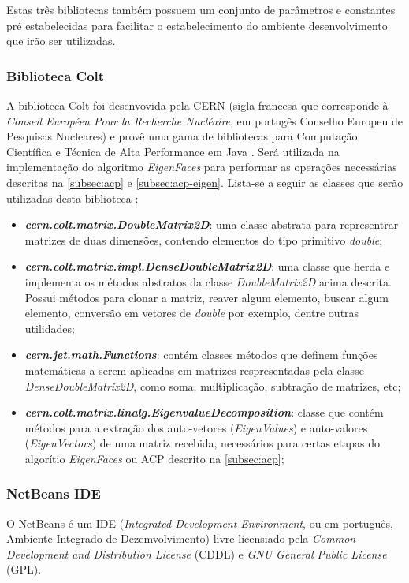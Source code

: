 Estas três bibliotecas também possuem um conjunto de parâmetros e constantes pré estabelecidas para facilitar o estabelecimento do ambiente desenvolvimento que irão ser utilizadas.

\subsubsection{Biblioteca Colt}\label{subsec:bib_colt}
A biblioteca Colt foi desenvovida pela CERN (sigla francesa que corresponde à \textit{Conseil Européen Pour la Recherche Nucléaire}, em portugês Conselho Europeu de Pesquisas Nucleares) e provê uma gama de bibliotecas para Computação Científica e Técnica de Alta Performance em Java \cite{colt}. Será utilizada na implementação do algoritmo \textit{EigenFaces} para performar as operações necessárias descritas na \autoref{subsec:acp} e \autoref{subsec:acp-eigen}. Lista-se a seguir as classes que serão utilizadas desta biblioteca \cite{colt}:


\begin{itemize}
	\item \textbf{\textit{cern.colt.matrix.DoubleMatrix2D}}: uma classe abstrata para representrar matrizes de duas dimensões, contendo elementos do tipo primitivo \textit{double};
	
	\item \textbf{\textit{cern.colt.matrix.impl.DenseDoubleMatrix2D}}: uma classe que herda e implementa os métodos abstratos da classe \textit{DoubleMatrix2D} acima descrita. Possui métodos para clonar a matriz, reaver algum elemento, buscar algum elemento, conversão em vetores de \textit{double} por exemplo, dentre outras utilidades;
			
	\item \textbf{\textit{cern.jet.math.Functions}}:  contém classes métodos que definem funções matemáticas a serem aplicadas em matrizes respresentadas pela classe \textit{DenseDoubleMatrix2D}, como soma, multiplicação, subtração de matrizes, etc;
	
	\item \textbf{\textit{cern.colt.matrix.linalg.EigenvalueDecomposition}}: classe que contém métodos para a extração dos auto-vetores (\textit{EigenValues}) e auto-valores (\textit{EigenVectors}) de uma matriz recebida, necessários para certas etapas do algorítio \textit{EigenFaces} ou ACP descrito na \autoref{subsec:acp};
\end{itemize}		

\subsubsection{NetBeans IDE}\label{subsec:netbeans}
O NetBeans é um IDE (\textit{Integrated Development Environment}, ou em português, Ambiente Integrado de Dezemvolvimento) livre licensiado pela \textit{Common Development and Distribution License} (CDDL) e \textit{GNU General Public License} (GPL).

